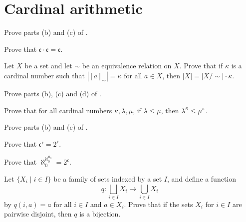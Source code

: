 \section{Cardinal arithmetic}


\begin{exercise}
Prove parts (b) and (c) of .
\end{exercise}


\begin{exercise}
Prove that $\mathfrak{c} \cdot \mathfrak{c} = \mathfrak{c}$.
\end{exercise}

\begin{exercise}
\label{exCardinalityOfQuotient}
Let $X$ be a set and let $\sim$ be an equivalence relation on $X$. Prove that if $\kappa$ is a cardinal number such that $|[a]_{\sim}| = \kappa$ for all $a \in X$, then $|X| = |X/{\sim}| \cdot \kappa$.
\end{exercise}


\begin{exercise}
Prove parts (b), (c) and (d) of .
\end{exercise}


\begin{exercise}
\label{exCardinalExponentiationIsMonotone}
Prove that for all cardinal numbers $\kappa, \lambda, \mu$, if $\lambda \le \mu$, then $\lambda^{\kappa} \le \mu^{\kappa}$.
\end{exercise}


\begin{exercise}
Prove parts (b) and (c) of .
\end{exercise}


\begin{exercise}
Prove that $\mathfrak{c}^{\mathfrak{c}} = 2^{\mathfrak{c}}$.
\end{exercise}

\begin{exercise}
Prove that $\aleph_0^{\aleph_0^{\aleph_0}} = 2^{\mathfrak{c}}$.
\end{exercise}


\begin{exercise}
\label{exFunctionFromDisjointUnionToUnionIsBijectionIfPairwiseDisjoint}
Let $\{ X_i \mid i \in I \}$ be a family of sets indexed by a set $I$, and define a function
\[ q : \bigsqcup_{i \in I} X_i \to \bigcup_{i \in I} X_i \]
by $q(i,a) = a$ for all $i \in I$ and $a \in X_i$. Prove that if the sets $X_i$ for $i \in I$ are pairwise disjoint, then $q$ is a bijection.
\end{exercise}

